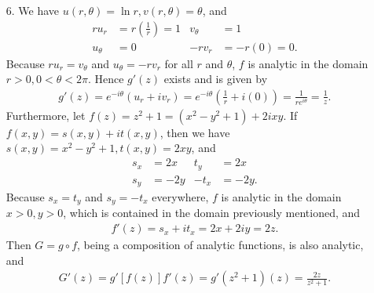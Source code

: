 \documentclass[a4paper,12pt]{article}
\begin{document}
\begin{enumerate}
    \item[6.]
        We have $u(r, \theta) = \ln r, v(r, \theta) = \theta$, and
        \begin{align*}
            r u_r &= r \left( \frac{1}{r} \right) = 1 &
            v_\theta &= 1 \\
            u_\theta &= 0 &
            -r v_r &= -r(0) = 0.
        \end{align*}
        Because $r u_r = v_\theta$ and $u_\theta = -r v_r$ for all $r$ and $\theta$, $f$ is analytic in the domain $r > 0, 0 < \theta < 2\pi$. Hence $g'(z)$ exists and is given by
        \begin{align*}
            g'(z) = e^{-i \theta} (u_r + iv_r) = e^{-i \theta} \left( \frac{1}{r} + i(0) \right) = \frac{1}{re^{i \theta}} = \frac{1}{z}.
        \end{align*}
        Furthermore, let $f(z) = z^2 + 1 = (x^2 - y^2 + 1) + 2ixy$. If $f(x, y) = s(x, y) + it(x, y)$, then we have $s(x, y) = x^2 - y^2 + 1, t(x, y) = 2xy$, and
        \begin{align*}
            s_x &= 2x &
            t_y &= 2x \\
            s_y &= -2y &
            -t_x &= -2y.
        \end{align*}
        Because $s_x = t_y$ and $s_y = -t_x$ everywhere, $f$ is analytic in the domain $x > 0, y > 0$, which is contained in the domain previously mentioned, and
        \begin{align*}
            f'(z) = s_x + it_x = 2x + 2iy = 2z.
        \end{align*}
        Then $G = g \circ f$, being a composition of analytic functions, is also analytic, and
        \begin{align*}
            G'(z) = g'[f(z)] f'(z) = g'(z^2 + 1) (z) = \frac{2z}{z^2 + 1}.
        \end{align*}
\end{enumerate}
\end{document}

